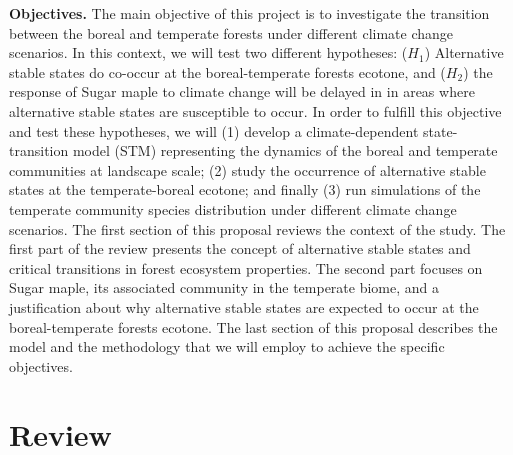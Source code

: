 \textbf{Objectives.} The main objective of this project is to investigate the
transition between the boreal and temperate forests under different climate
change scenarios. In this context, we will test two different hypotheses:
($H_1$) Alternative stable states do co-occur at the boreal-temperate forests
ecotone, and ($H_2$) the response of Sugar maple to climate change will be
delayed in  in areas where alternative stable states are susceptible to occur.
In order to fulfill this objective and test these hypotheses, we will (1)
develop a climate-dependent  state-transition model (STM) representing the
dynamics of the boreal and temperate communities at landscape scale; (2) study
the occurrence of alternative stable states at the temperate-boreal ecotone;
and finally (3) run simulations of the temperate community species
distribution under different climate change scenarios. The first section of
this proposal reviews the context of the study. The first part of the review
presents the concept of alternative stable states and critical transitions in
forest ecosystem properties. The second part focuses on Sugar maple, its
associated community in the temperate biome, and a justification about why
alternative stable states are expected to occur at the boreal-temperate
forests ecotone. The last section of this proposal describes the model and the
methodology that we will employ to achieve the specific objectives.


\section{Review} 

